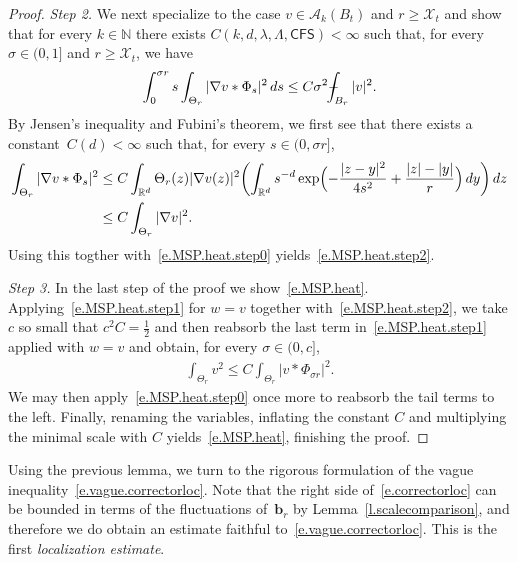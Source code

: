\documentclass[11pt]{article} %
\numberwithin{equation}{section}
\theoremstyle{definition}
\newcommand*{\N}{\ensuremath{\mathbb{N}}}
\newcommand*{\R}{\ensuremath{\mathbb{R}}}
\renewcommand{\b}{\ensuremath{\mathbf{b}}}
\newcommand{\X}{\mathcal{X}}
\def\Xint#1{\mathchoice
{\XXint\displaystyle\textstyle{#1}}%
{\XXint\textstyle\scriptstyle{#1}}%
{\XXint\scriptstyle\scriptscriptstyle{#1}}%
{\XXint\scriptscriptstyle\scriptscriptstyle{#1}}%
\!\int}
\def\XXint#1#2#3{{\setbox0=\hbox{$#1{#2#3}{\int}$}
\vcenter{\hbox{$#2#3$}}\kern-.5\wd0}}
\def\fint{\Xint-}
\newcommand{\CFS}{\mathsf{CFS}}
\newcommand{\A}{\mathcal{A}}
\begin{document}
\begin{proof}
\emph{Step 2.}
We next specialize to the case $v \in \A_k(B_t)$ and $r \geq  \X_t$ and show that for every $k \in \N$ there exists $C(k,d,\lambda,\Lambda,\CFS)<\infty$ such that, for every $\sigma \in (0,1]$ and $r \geq \X_t$, we have
\begin{align} \label{e.MSP.heat.step2}
 \int_{0}^{\sigma r} s \int_{\Theta_r} | \nabla v \ast \Phi_{s}|^2 \, ds
\leq 
C \sigma^2 \fint_{B_r} |v|^2 
.
\end{align}
By Jensen's inequality and Fubini's theorem, we first see that there exists a constant~$C(d)<\infty$ such that, for every $s \in (0,\sigma r]$, 
\begin{align*} %
\int_{\Theta_r} | \nabla v \ast \Phi_{s}|^2 
& 
\leq 
C  \int_{\R^d} \Theta_r(z) | \nabla v(z)|^2 \biggl( \int_{\R^d} s^{-d} \exp\Bigl( - \frac{|z-y|^2}{4s^2} + \frac{|z|-|y|}{r} \Bigr) \, dy \biggr) \, dz 
\\ \notag 
&
\leq
C \int_{\Theta_r} | \nabla v|^2 
.
\end{align*}
Using this togther with~\eqref{e.MSP.heat.step0} yields~\eqref{e.MSP.heat.step2}.

 \smallskip
 
\emph{Step 3.}
In the last step of the proof we show~\eqref{e.MSP.heat}. Applying~\eqref{e.MSP.heat.step1} for $w = v$ together with~\eqref{e.MSP.heat.step2}, we take $c$ so small that $c^2 C =\frac12$ and then reabsorb 
the last term in~\eqref{e.MSP.heat.step1} applied with $w = v$ and obtain, for every $\sigma \in (0,c]$, 
\begin{align*}  
\int_{\Theta_r} v^2  \leq C \int_{\Theta_r} | v \ast \Phi_{\sigma r}|^2 
.
\end{align*}
We may then apply~\eqref{e.MSP.heat.step0} once more to reabsorb the tail terms to the left. Finally, renaming the variables, inflating the constant $C$ and multiplying the minimal scale with $C$ yields~\eqref{e.MSP.heat}, finishing the proof.
\end{proof}


Using the previous lemma, we turn to the rigorous formulation of the vague inequality~\eqref{e.vague.correctorloc}. 
Note that the right side of~\eqref{e.correctorloc} can be bounded in terms of the fluctuations of~$\b_r$ by Lemma~\ref{l.scalecomparison}, and therefore we do obtain an estimate faithful to~\eqref{e.vague.correctorloc}.  This is the first \emph{localization estimate}. 
\end{document}
